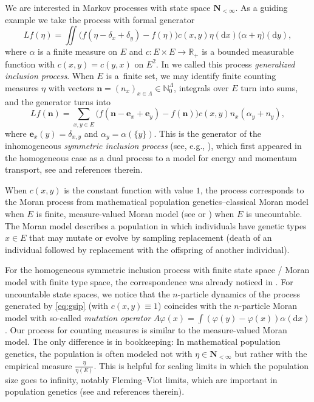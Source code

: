 \documentclass[pdftex]{sigma}
\numberwithin{equation}{section}
\newcommand{\N}{\mathbb{N}}
\newcommand{\R}{\mathbb{R}}
\newcommand{\dd}{\mathrm{d}} %
\newcommand{\vect}[1]{\boldsymbol{#1}}
\newcommand{\1}{\mathbbm{1}}
\begin{document}
We are interested in Markov processes with state space $\mathbf N_{<\infty}$. As a guiding example we take the process with formal generator
\begin{equation} \label{eq:gsip}
	L f(\eta) = \iint \bigl( f(\eta-\delta_x+\delta_y)- f(\eta)\bigr) c(x,y) \eta(\dd x) \bigl( \alpha+\eta\bigr) (\dd y),
\end{equation}
where $\alpha$ is a finite measure on $E$ and $c\colon E\times E\to \R_+$ is a bounded measurable function with $c(x,y) = c(y,x)$ on $E^2$. In \cite{IntertwiningConsistent} we called this process \emph{generalized inclusion process}. When $E$ is a~finite set, we may identify finite counting measures $\eta$ with vectors $\vect n = (n_x)_{x\in \Lambda}\in \N_0^\Lambda$, integrals over $E$ turn into sums, and the generator turns into
\begin{equation} \label{eq:sip}
	Lf(\vect n) = \sum_{x,y\in E} \bigl( f(\vect n- \vect e_x+\vect e_y) - f(\vect n)\bigr) c(x,y) n_x (\alpha_y+n_y),
\end{equation}
where $\vect e_x(y) = \delta_{x,y}$ and $\alpha_y = \alpha(\{y\})$. This is the generator of the inhomogeneous \emph{symmetric inclusion process} (see, e.g., \cite[equation~(2.2)]{floreani2020orthogonal}), which first appeared in the homogeneous case as a dual process to a model for energy and momentum transport, see \cite{giardina-redig-vafayi2010} and references therein.

When $c(x,y)$ is the constant function with value $1$, the process corresponds to the Moran process from mathematical population genetics--classical Moran model \cite{TransitionMoran,Moran} when $E$ is finite, measure-valued Moran model (see \cite[Section 2.6]{DawsonMeasureValuedMarkovProcesses} or \cite[Section~5.4]{Etheridge00}) when $E$ is uncountable. The Moran model describes a population in which individuals have genetic types $x\in E$ that may mutate or evolve by sampling replacement (death of an individual followed by replacement with the offspring of another individual).

For the homogeneous symmetric inclusion process with finite state space / Moran model with finite type space, the correspondence was already noticed in \cite[Section~5]{carinci2015dualities}. For uncountable state spaces, we notice that the $n$-particle dynamics of the process generated by \eqref{eq:gsip} (with $c(x,y) \equiv 1$) coincides with the $n$-particle Moran model \cite[equation~(2.5.2)]{DawsonMeasureValuedMarkovProcesses} with so-called \emph{mutation operator} $A\varphi(x) = \int( \varphi(y) - \varphi(x)) \alpha(\mathrm d x)$. Our process for counting measures is similar to the measure-valued Moran model. The only difference is in bookkeeping: In mathematical population genetics, the population is often modeled not with $\eta \in \mathbf N_{<\infty}$ but rather with the empirical measure $\frac{\eta}{\eta(E)}$. This is helpful for scaling limits in which the population size goes to infinity, notably Fleming--Viot limits, which are important in population genetics (see \cite{shigaDiffusions} and references therein).
\end{document}
